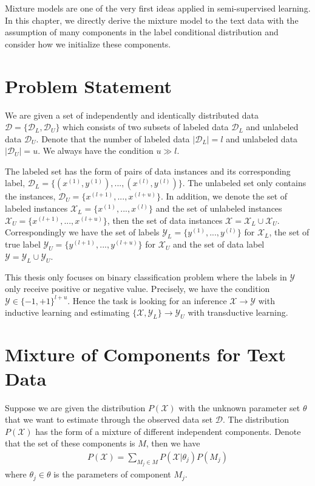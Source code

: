 Mixture models are one of the very first ideas applied in semi-supervised learning.  In this chapter, we directly derive the mixture model to the text data with the assumption of many components in the label conditional distribution and consider how we initialize these components.

\section{Problem Statement}
We are given a set of independently and identically distributed data $\mathcal{D} = \{\mathcal{D}_L, \mathcal{D}_U\}$ which consists of two subsets of labeled data $\mathcal{D}_L$ and unlabeled data $\mathcal{D}_U$. Denote that the number of labeled data $|\mathcal{D}_L| = l$ and unlabeled data $|\mathcal{D}_U| = u$. We always have the condition $u \gg l$. 

The labeled set has the form of pairs of data instances and its corresponding label, $\mathcal{D}_L = \{ (x^{(1)}, y^{(1)}), ..., (x^{(l)}, y^{(l)}) \}$. The unlabeled set only contains the instances, $\mathcal{D}_U = \{ x^{(l+1)}, ..., x^{(l+u)} \}$. In addition, we denote the set of labeled instances $\mathcal{X}_L = \{ x^{(1)}, ..., x^{(l)} \}$ and the set of unlabeled instances $\mathcal{X}_U = \{ x^{(l+1)}, ..., x^{(l+u)} \}$, then the set of data instances $\mathcal{X} = \mathcal{X}_L \cup \mathcal{X}_U $. Correspondingly we have the set of labels $\mathcal{Y}_L = \{ y^{(1)}, ..., y^{(l)} \}$ for $\mathcal{X}_L$, the set of true label $\mathcal{Y}_U = \{ y^{(l+1)}, ..., y^{(l+u)} \}$ for $\mathcal{X}_U$ and the set of data label $\mathcal{Y} = \mathcal{Y}_L \cup \mathcal{Y}_U$.

This thesis only focuses on binary classification problem where the labels in $\mathcal{Y}$ only receive positive or negative value. Precisely, we have the condition $\mathcal{Y} \in \{-1,+1\}^{l+u}$. Hence the task is looking for an inference $\mathcal{X} \rightarrow \mathcal{Y}$ with inductive learning and estimating $\{ \mathcal{X}, \mathcal{Y}_L \} \rightarrow \mathcal{Y}_U$ with transductive learning.

\section{Mixture of Components for Text Data}
Suppose we are given the distribution $P(\mathcal{X})$ with the unknown parameter set $\theta$ that we want to estimate through the observed data set $\mathcal{D}$. The distribution $P(\mathcal{X})$ has the form of a mixture of different independent components. Denote that the set of these components is $M$, then we have
\begin{align}
	\label{equal2: general many-to-one assumption}
	P(\mathcal{X}) = \sum_{M_j \in M}{P(\mathcal{X} | \theta_j) P(M_j)}
\end{align}
where $\theta_j \in \theta$ is the parameters of component $M_j$.

